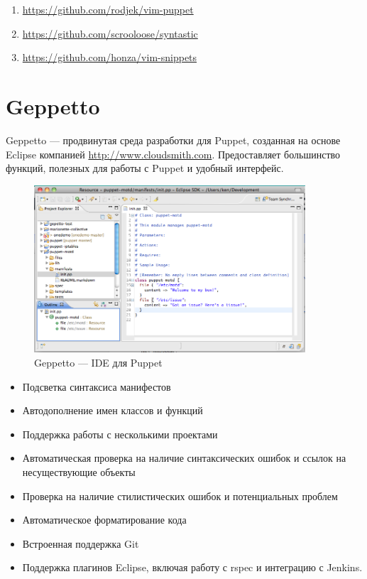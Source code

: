 \begin{enumerate}
\item \url{https://github.com/rodjek/vim-puppet}
\item \url{https://github.com/scrooloose/syntastic}
\item \url{https://github.com/honza/vim-snippets}
\end{enumerate}

\section{Geppetto}

Geppetto --- продвинутая среда разработки для Puppet, созданная на основе Eclipse компанией \url{http://www.cloudsmith.com}. Предоставляет большинство функций, полезных для работы с Puppet и удобный интерфейс.

\begin{figure}[!h]
\centering
\includegraphics[width=0.9\textwidth]{img/geppetto.png}
\caption{Geppetto --- IDE для Puppet}
\label{fig:geppetto}
\end{figure}

\begin{itemize}
\item Подсветка синтаксиса манифестов
\item Автодополнение имен классов и функций
\item Поддержка работы с несколькими проектами
\item Автоматическая проверка на наличие синтаксических ошибок и ссылок на несуществующие объекты
\item Проверка на наличие стилистических ошибок и потенциальных проблем
\item Автоматическое форматирование кода
\item Встроенная поддержка Git
\item Поддержка плагинов Eclipse, включая работу с rspec и интеграцию с Jenkins.
\end{itemize}

